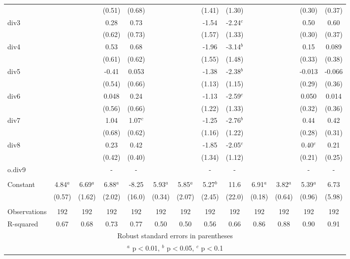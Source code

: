\documentclass[]{article}
\begin{document}
\begin{tabular}{lcccccccccccc}
 &  &  & (0.51) & (0.68) &  &  & (1.41) & (1.30) &  &  & (0.30) & (0.37) \\
div3 &  &  & 0.28 & 0.73 &  &  & -1.54 & -2.24$^c$ &  &  & 0.50 & 0.60 \\
 &  &  & (0.62) & (0.73) &  &  & (1.57) & (1.33) &  &  & (0.30) & (0.37) \\
div4 &  &  & 0.53 & 0.68 &  &  & -1.96 & -3.14$^b$ &  &  & 0.15 & 0.089 \\
 &  &  & (0.61) & (0.62) &  &  & (1.55) & (1.48) &  &  & (0.33) & (0.38) \\
div5 &  &  & -0.41 & 0.053 &  &  & -1.38 & -2.38$^b$ &  &  & -0.013 & -0.066 \\
 &  &  & (0.54) & (0.66) &  &  & (1.13) & (1.15) &  &  & (0.29) & (0.36) \\
div6 &  &  & 0.048 & 0.24 &  &  & -1.13 & -2.59$^c$ &  &  & 0.050 & 0.014 \\
 &  &  & (0.56) & (0.66) &  &  & (1.22) & (1.33) &  &  & (0.32) & (0.36) \\
div7 &  &  & 1.04 & 1.07$^c$ &  &  & -1.25 & -2.76$^b$ &  &  & 0.44 & 0.42 \\
 &  &  & (0.68) & (0.62) &  &  & (1.16) & (1.22) &  &  & (0.28) & (0.31) \\
div8 &  &  & 0.23 & 0.42 &  &  & -1.85 & -2.05$^c$ &  &  & 0.40$^c$ & 0.21 \\
 &  &  & (0.42) & (0.40) &  &  & (1.34) & (1.12) &  &  & (0.21) & (0.25) \\
o.div9 &  &  & - & - &  &  & - & - &  &  & - & - \\
 &  &  &  &  &  &  &  &  &  &  &  &  \\
Constant & 4.84$^a$ & 6.69$^a$ & 6.88$^a$ & -8.25 & 5.93$^a$ & 5.85$^a$ & 5.27$^b$ & 11.6 & 6.91$^a$ & 3.82$^a$ & 5.39$^a$ & 6.73 \\
 & (0.57) & (1.62) & (2.02) & (16.0) & (0.34) & (2.07) & (2.45) & (22.0) & (0.18) & (0.64) & (0.96) & (5.98) \\
 &  &  &  &  &  &  &  &  &  &  &  &  \\
Observations & 192 & 192 & 192 & 192 & 192 & 192 & 192 & 192 & 192 & 192 & 192 & 192 \\
 R-squared & 0.67 & 0.68 & 0.73 & 0.77 & 0.50 & 0.50 & 0.56 & 0.66 & 0.86 & 0.88 & 0.90 & 0.91 \\ \hline
\multicolumn{13}{c}{ Robust standard errors in parentheses} \\
\multicolumn{13}{c}{ $^a$ p$<$0.01, $^b$ p$<$0.05, $^c$ p$<$0.1} \\
\end{tabular}
\end{document}
